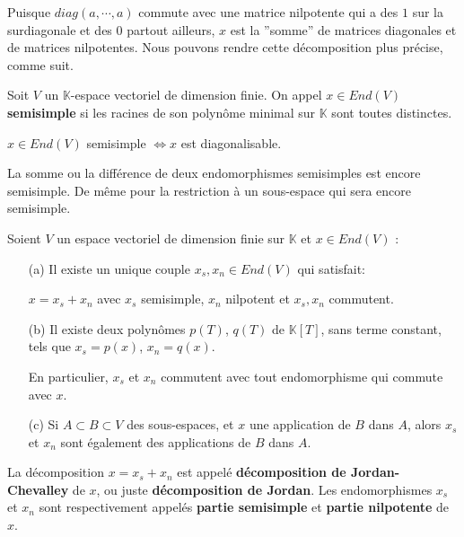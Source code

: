 \documentclass[a4paper,openany,12pt]{report}
\newcommand{\KK}{\mathbb{K}}
\theoremstyle{break}
{\theorembodyfont{\upshape}
\newtheorem*{rmq}{Remarque :}
\newtheorem*{prv}{Preuve :}
\newtheorem*{ex}{Exemples :}
\newtheorem*{exe}{Exemple : }
\newtheorem*{nota}{Notation :}
\newtheorem*{dem}{D\'emonstration :}}
\begin{document}
Puisque $diag(a, \cdots, a)$ commute avec une matrice nilpotente qui a des $1$ sur la surdiagonale et des $0$ partout ailleurs, $x$ est la ''somme'' de matrices diagonales et de matrices nilpotentes. Nous pouvons rendre cette décomposition plus précise, comme suit. 

\begin{df}
\quad Soit $V$ un $\KK$-espace vectoriel de dimension finie. On appel $x \in End(V)$ \textbf{semisimple} si les racines de son polynôme minimal sur $\KK$ sont toutes distinctes. 
\end{df}

\begin{prop}
\quad $x \in End(V)$ semisimple $\iff x$ est diagonalisable. 
\end{prop}

\begin{rmq}
\quad La somme ou la différence de deux endomorphismes semisimples est encore semisimple. De même pour la restriction à un sous-espace qui sera encore semisimple.
\end{rmq}

\begin{prop}\label{prop:C1}
\quad Soient $V$ un espace vectoriel de dimension finie sur $\KK$ et $x \in End(V)$ :
\begin{itemize}
\item[(a)] Il existe un unique couple $x_{s},x_{n} \in End(V)$ qui satisfait: 
\begin{center}
$x=x_{s}+x_{n}$ avec $x_{s}$ semisimple, $x_{n}$ nilpotent et $x_{s},x_{n}$ commutent.
\end{center}

\item[(b)] Il existe deux polynômes $p(T)$, $q(T)$ de $\KK[T]$, sans terme constant, tels que $x_{s}=p(x)$, $x_{n} = q(x)$. 

En particulier, $x_{s}$ et $x_{n}$ commutent avec tout endomorphisme qui commute avec $x$.

\item[(c)] Si $A \subset B \subset V$ des sous-espaces, et $x$ une application de $B$ dans $A$, alors $x_{s}$ et $x_{n}$ sont également des applications de $B$ dans $A$. 
\end{itemize}
\end{prop}

\begin{df}
\quad La décomposition $x = x_{s}+x_{n}$ est appelé \textbf{décomposition de Jordan-Chevalley} de $x$, ou juste \textbf{décomposition de Jordan}. Les endomorphismes $x_{s}$ et $x_{n}$ sont respectivement appelés \textbf{partie semisimple} et \textbf{partie nilpotente} de $x$.
\end{df}
\end{document}
